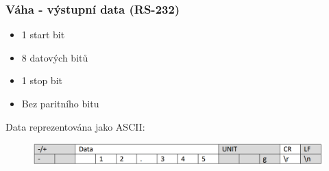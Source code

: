 \documentclass[%
  12pt,       				%
	t,                  %
	aspectratio=1610,   %
	unicode,						%
]{beamer}				    	%
\begin{document}
\begin{frame}[c] 
    \frametitle{Váha - výstupní data (RS-232)}

    \begin{itemize}
                \item 1 start bit
				\item 8 datových bitů
				\item 1 stop bit
                \item Bez paritního bitu
    \end{itemize}
    \vspace{1cm}	
    
    Data reprezentována jako ASCII:    
    \begin{figure}%
				\centering
				\includegraphics[width=0.9\columnwidth]{obrazky/ascii.png}
			\end{figure}
    
\end{frame}

%
%
%
\end{document}
